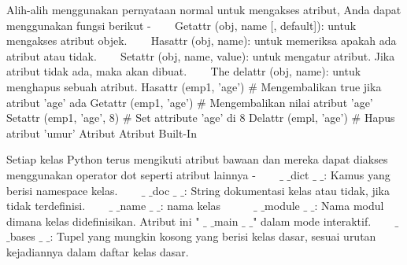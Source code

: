 {Alih-alih menggunakan pernyataan normal untuk mengakses atribut, Anda dapat menggunakan fungsi berikut - 
\vspace{12pt}
\noindent 
~~~ Getattr (obj, name [, default]): untuk mengakses atribut objek. 
\vspace{12pt}
\noindent 
~~~ Hasattr (obj, name): untuk memeriksa apakah ada atribut atau tidak. 
\vspace{12pt}
\noindent 
~~~ Setattr (obj, name, value): untuk mengatur atribut. Jika atribut tidak ada, maka akan dibuat. 
\vspace{12pt}
\noindent 
~~~ The delattr (obj, name): untuk menghapus sebuah atribut. 
\vspace{12pt}
\noindent 
Hasattr (emp1, 'age')  $  \#  $ Mengembalikan true jika atribut 'age' ada 
\noindent 
Getattr (emp1, 'age')  $  \#  $ Mengembalikan nilai atribut 'age' 
\noindent 
Setattr (emp1, 'age', 8)  $  \#  $ Set attribute 'age' di 8 
\noindent 
Delattr (empl, 'age')  $  \#  $ Hapus atribut 'umur' 
\vspace{12pt}
\noindent 
Atribut Atribut Built-In 
\vspace{12pt}
\noindent 

Setiap kelas Python terus mengikuti atribut bawaan dan mereka dapat diakses menggunakan operator dot seperti atribut lainnya - 
\vspace{12pt}
\noindent 
~~~  $  \_  $ $  \_  $dict $  \_  $ $  \_  $: Kamus yang berisi namespace kelas. 
\vspace{12pt}
\noindent 
~~~  $  \_  $ $  \_  $doc $  \_  $ $  \_  $: String dokumentasi kelas atau tidak, jika tidak terdefinisi. 
\vspace{12pt}
\noindent 
~~~  $  \_  $ $  \_  $name $  \_  $ $  \_  $: nama kelas \
\vspace{12pt}
\noindent 
~~~  $  \_  $ $  \_  $module $  \_  $ $  \_  $: Nama modul dimana kelas didefinisikan. Atribut ini " $  \_  $ $  \_  $main $  \_  $ $  \_  $" dalam mode interaktif. 
\vspace{12pt}
\noindent 
~~~  $  \_  $ $  \_  $bases $  \_  $ $  \_  $: Tupel yang mungkin kosong yang berisi kelas dasar, sesuai urutan kejadiannya dalam daftar kelas dasar. 
\vspace{12pt}
\noindent 

}
